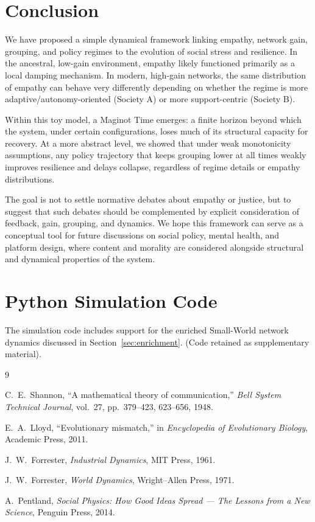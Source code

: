 \documentclass[11pt]{article}
\theoremstyle{plain}
\begin{document}
\section{Conclusion}

We have proposed a simple dynamical framework linking empathy, network gain, grouping, and policy regimes to the evolution of social stress and resilience.
In the ancestral, low-gain environment, empathy likely functioned primarily as a local damping mechanism.
In modern, high-gain networks, the same distribution of empathy can behave very differently depending on whether the regime is more adaptive/autonomy-oriented (Society A) or more support-centric (Society B).

Within this toy model, a Maginot Time emerges: a finite horizon beyond which the system, under certain configurations, loses much of its structural capacity for recovery.
At a more abstract level, we showed that under weak monotonicity assumptions, any policy trajectory that keeps grouping lower at all times weakly improves resilience and delays collapse, regardless of regime details or empathy distributions.

The goal is not to settle normative debates about empathy or justice, but to suggest that such debates should be complemented by explicit consideration of feedback, gain, grouping, and dynamics.
We hope this framework can serve as a conceptual tool for future discussions on social policy, mental health, and platform design, where content and morality are considered alongside structural and dynamical properties of the system.

\appendix

\section{Python Simulation Code}
\label{app:code}

The simulation code includes support for the enriched Small-World network dynamics discussed in Section~\ref{sec:enrichment}.
(Code retained as supplementary material).

\begin{thebibliography}{9}

C.~E.~Shannon,
``A mathematical theory of communication,''
\emph{Bell System Technical Journal}, vol.~27, pp.~379--423, 623--656, 1948.

E.~A.~Lloyd,
``Evolutionary mismatch,''
in \emph{Encyclopedia of Evolutionary Biology},
Academic Press, 2011.

J.~W.~Forrester,
\emph{Industrial Dynamics},
MIT Press, 1961.

J.~W.~Forrester,
\emph{World Dynamics},
Wright--Allen Press, 1971.

A.~Pentland,
\emph{Social Physics: How Good Ideas Spread --- The Lessons from a New Science},
Penguin Press, 2014.

\end{thebibliography}
\end{document}
